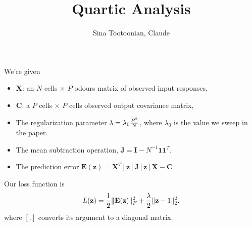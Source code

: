 \documentclass[10pt]{article}
\newcommand{\XX}{\mathbf{X}}
\newcommand{\EE}{\mathbf{E}}
\newcommand{\JJ}{\mathbf{J}}
\newcommand{\II}{\mathbf{I}}
\newcommand{\bone}{\mathbf{1}}
\newcommand{\CC}{\mathbf{C}}
\newcommand{\zz}{\mathbf{z}}
\begin{document}
\title{Quartic Analysis}
\author{
  Sina Tootoonian, Claude 
}
\maketitle{}
We're given
\begin{itemize}
  \item $\XX$: an $N$ cells $\times$ $P$ odours matrix of observed input responses,  
  \item $\CC$: a $P$ cells $\times$ $P$ cells observed output covariance matrix,
  \item The regularization parameter $\lambda = \lambda_0 {P^2 \over N}$, where $\lambda_0$ is the value we sweep in the paper.
  \item The mean subtraction operation, $\JJ = \II - N^{-1} \bone \bone^T$.
    \item The prediction error $\EE(\zz) = \XX^T [\zz] \JJ [\zz] \XX - \CC$
\end{itemize}
Our loss function is
\begin{align}
  \label{eq:loss}
  L(\zz) = {1 \over 2}\|\EE(\zz)\|_F^2 + {\lambda \over 2}\|\zz - 1\|_2^2,
\end{align}
where $[.]$ converts its argument to a diagonal matrix.
\end{document}
